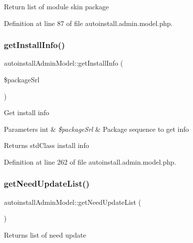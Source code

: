 Return list of module skin package 

Definition at line 87 of file autoinstall.\+admin.\+model.\+php.

\mbox{\label{classautoinstallAdminModel_a8824834dd97b7e69b74af51778d27ed6}} 
\subsubsection{\texorpdfstring{get\+Install\+Info()}{getInstallInfo()}}
{\footnotesize\ttfamily autoinstall\+Admin\+Model\+::get\+Install\+Info (\begin{DoxyParamCaption}\item[{}]{\$package\+Srl }\end{DoxyParamCaption})}

Get install info


\begin{DoxyParams}[1]{Parameters}
int & {\em \$package\+Srl} & Package sequence to get info \\
\hline
\end{DoxyParams}
\begin{DoxyReturn}{Returns}
std\+Class install info 
\end{DoxyReturn}


Definition at line 262 of file autoinstall.\+admin.\+model.\+php.

\mbox{\label{classautoinstallAdminModel_a6bba9a390c1274bc3c39a39310781b01}} 
\subsubsection{\texorpdfstring{get\+Need\+Update\+List()}{getNeedUpdateList()}}
{\footnotesize\ttfamily autoinstall\+Admin\+Model\+::get\+Need\+Update\+List (\begin{DoxyParamCaption}{ }\end{DoxyParamCaption})}

Returns list of need update 

